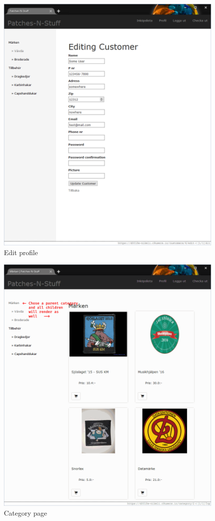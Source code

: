 \documentclass[paper=a4, fontsize=11pt]{report} %
\begin{document}
\begin{figure}
	\includegraphics[width=0.9\paperwidth]{artifacts/stories/6_edit_profile.png}
	\caption{Edit profile}
	\label{fig:edit_profile}
\end{figure}

\begin{figure}
	\includegraphics[width=0.9\paperwidth]{artifacts/stories/7_products.png}
	\caption{Category page}
	\label{fig:products}
\end{figure}
\end{document}
